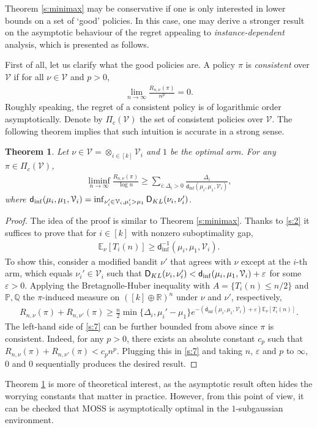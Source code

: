 \documentclass[10pt,a4article]{amsart}
\numberwithin{equation}{section}
\theoremstyle{plain}
\newtheorem{Th}{Theorem}
\theoremstyle{definition}
\def\R{{\mathbb R}}
\def\Q{{\mathbb Q}}
\def\E{{\mathbb E}}
\def\R{{\mathbb R}}
\def\P{{\mathbb P}}
\def\V{{\mathcal V}}
\def\e{{\varepsilon}}
\begin{document}
Theorem \ref{s:minimax} may be conservative if one is only interested in lower bounds on a set of `good' policies. In this case, one may derive a stronger result on the asymptotic behaviour of the regret appealing to \emph{instance-dependent} analysis, which is presented as follows.  

First of all, let us clarify what the good policies are. A policy $\pi$ is \emph{consistent} over $\V$ if for all $\nu\in\V$ and $p>0$, 
\begin{align*}
\lim_{n\rightarrow\infty}\frac{R_{n, \nu}(\pi)}{n^p} = 0. 
\end{align*}
Roughly speaking, the regret of a consistent policy is of logarithmic order asymptotically. Denote by $\Pi_{c}(\V)$ the set of consistent policies over $\V$. The following theorem implies that such intuition is accurate in a strong sense. 

\begin{Th}\label{s:ins}
Let $\nu\in\V = \otimes_{i\in [k]} \V_i$ and $1$ be the optimal arm. For any $\pi\in\Pi_c(\V)$,
\begin{align}
\liminf_{n\rightarrow\infty}\frac{R_{n,\nu}(\pi)}{\log n}\geq \sum_{i: \Delta_i>0}\frac{\Delta_i}{\mathsf d_{\inf} (\mu_i, \mu_1, \V_i)}, 
\end{align}
where $\mathsf d_{\inf} (\mu_i, \mu_1, \V_i) = \inf_{\nu_i'\in\V_i, \mu_i'>\mu_1}\textsf D_{KL}(\nu_i, \nu_i')$. 
\end{Th}
\begin{proof}
The idea of the proof is similar to Theorem \ref{s:minimax}. Thanks to \eqref{s:2} it suffices to prove that for $i\in [k]$ with nonzero suboptimality gap, 
\begin{align*}
\E_\nu[T_i(n)]\geq \mathsf d^{-1}_{\inf} (\mu_i, \mu_1, \V_i).
\end{align*}
To show this, consider a modified bandit $\nu'$ that agrees with $\nu$ except at the $i$-th arm, which equals $\nu_i'\in\V_i$ such that $\textsf D_{KL}(\nu_i, \nu_i') < \mathsf d_{\inf} (\mu_i, \mu_1, \V_i)+\e$ for some $\e>0$. Applying the Bretagnolle-Huber inequality with $A = \{T_i(n)\leq n/2\}$ and $\P, \Q$ the $\pi$-induced measure on $([k]\oplus\R)^n$ under $\nu$ and $\nu'$, respectively, 
\begin{align}
R_{n, \nu}(\pi)+R_{n, \nu'}(\pi)\geq\frac{n}{2}\min\{\Delta_i, \mu_i'-\mu_1\}e^{-(\mathsf d_{\inf} (\mu_i, \mu_1, \V_i)+\e)\E_\nu[T_i(n)]}.\label{s:7}
\end{align}
The left-hand side of \eqref{s:7} can be further bounded from above since $\pi$ is consistent. Indeed, for any $p>0$, there exists an absolute constant $c_p$ such that $R_{n, \nu}(\pi)+R_{n, \nu'}(\pi)<c_pn^p$. Plugging this in \eqref{s:7} and taking $n$, $\e$ and $p$ to $\infty$, $0$ and $0$ sequentially produces the desired result. 
\end{proof}
Theorem \ref{s:ins} is more of theoretical interest, as the asymptotic result often hides the worrying constants that matter in practice. However, from this point of view, it can be checked that MOSS is asymptotically optimal in the $1$-subgaussian environment.   
\end{document}

